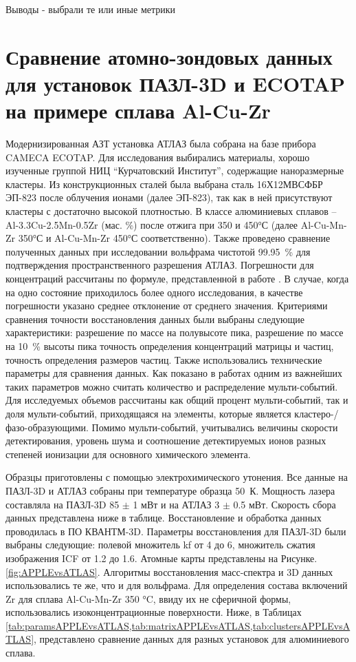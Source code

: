 \FloatBarrier
Выводы - выбрали те или иные метрики

\FloatBarrier

\section{Сравнение атомно-зондовых данных для установок ПАЗЛ-3D и ECOTAP на примере сплава Al-Cu-Zr}\label{sec:ch3/sect4}

Модернизированная АЗТ установка АТЛАЗ была собрана на базе прибора CAMECA ECOTAP. 
Для исследования выбирались материалы, хорошо изученные группой НИЦ “Курчатовский Институт”, содержащие наноразмерные кластеры. Из конструкционных сталей была выбрана сталь 16Х12МВСФБР ЭП-823 \cite{Porollo04} после облучения ионами (далее ЭП-823), так как в ней присутствуют кластеры с достаточно высокой плотностью. В классе алюминиевых сплавов – Al-3.3Cu-2.5Mn-0.5Zr (мас. \%) после отжига при 350 и 450°С \cite{Belov22,Belov21} (далее Al-Cu-Mn-Zr 350°С и Al-Cu-Mn-Zr 450°С соответственно). Также проведено сравнение полученных данных при исследовании вольфрама чистотой 99.95~\% для подтверждения пространственного разрешения АТЛАЗ. Погрешности для концентраций рассчитаны по формуле, представленной в работе \cite{Danoix071,Danoix072}. В случае, когда на одно состояние приходилось более одного исследования, в качестве погрешности указано среднее отклонение от среднего значения.
Критериями сравнения точности восстановления данных были выбраны следующие характеристики: разрешение по массе на полувысоте пика, разрешение по массе на 10~\% высоты пика точность определения концентраций матрицы и частиц, точность определения размеров частиц. Также использовались технические параметры для сравнения данных. Как показано в работах \cite{Tang10,Geuser07} одним из важнейших таких параметров можно считать количество и распределение мульти-событий. Для исследуемых объемов рассчитаны как общий процент мульти-событий, так и доля мульти-событий, приходящаяся на элементы, которые является кластеро-/фазо-образующими. Помимо мульти-событий, учитывались величины скорости детектирования, уровень шума и соотношение детектируемых ионов разных степеней ионизации для основного химического элемента.

Образцы приготовлены с помощью электрохимического утонения. Все данные на ПАЗЛ-3D и АТЛАЗ собраны при температуре образца 50~К. Мощность лазера составляла на ПАЗЛ-3D 85 $\pm$ 1 мВт и на АТЛАЗ 3 $\pm$ 0.5 мВт. Скорость сбора данных представлена ниже в таблице. Восстановление и обработка данных проводилась в ПО КВАНТМ-3D. Параметры восстановления для ПАЗЛ-3D были выбраны следующие: полевой множитель kf от 4 до 6, множитель сжатия изображения ICF от 1.2 до 1.6. Атомные карты представлены на Рисунке.  \cref{fig:APPLEvsATLAS}. Алгоритмы восстановления масс-спектра и 3D данных использовались те же, что и для вольфрама. Для определения состава включений Zr для сплава Al-Cu-Mn-Zr 350 °C, ввиду их не сферичной формы, использовались изоконцентрационные поверхности. Ниже, в Таблицах \cref{tab:paramsAPPLEvsATLAS,tab:matrixAPPLEvsATLAS,tab:clustersAPPLEvsATLAS}, представлено сравнение данных для разных установок для алюминиевого сплава.

